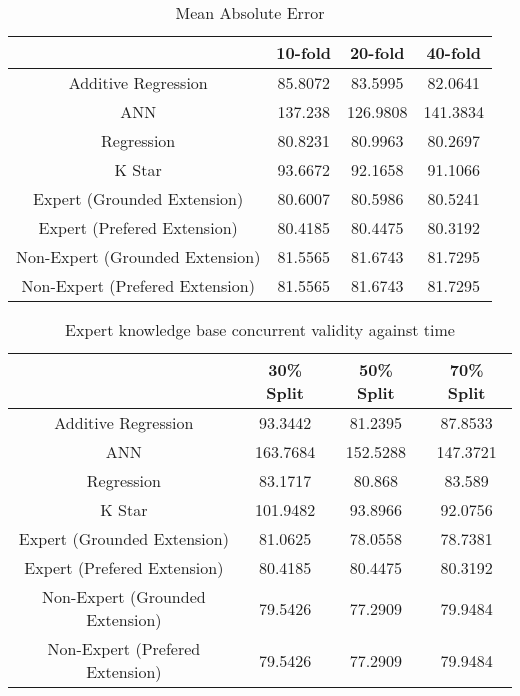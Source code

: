 \begin{table}[!htbp]
\centering
\begin{tabular}{|c|c|c|c|}
\hline
                                &  10-fold & 20-fold & 40-fold \\ \hline
Additive Regression             & 85.8072  & 83.5995  & 82.0641 \\
ANN                             & 137.238 & 126.9808 & 141.3834 \\
Regression                      & 80.8231 & 80.9963 & 80.2697 \\
K Star                          & 93.6672 & 92.1658 & 91.1066 \\
Expert (Grounded Extension)     & 80.6007 & 80.5986 & 80.5241 \\
Expert (Prefered Extension)     & 80.4185 & 80.4475 &  80.3192 \\
Non-Expert (Grounded Extension) & 81.5565 & 81.6743 & 81.7295 \\
Non-Expert (Prefered Extension) & 81.5565 & 81.6743 & 81.7295 \\
\hline
\end{tabular}
\caption{Mean Absolute Error}
\label{tab:time_predictions}
\end{table}

\begin{table}[!htbp]
\centering
\begin{tabular}{|c|c|c|c|}
\hline
                                & 30\% Split  & 50\% Split  & 70\% Split \\ \hline
Additive Regression             & 93.3442  & 81.2395  & 87.8533 \\
ANN                             & 163.7684 & 152.5288 & 147.3721 \\
Regression                      & 83.1717 & 80.868 & 83.589 \\
K Star                          & 101.9482 & 93.8966 & 92.0756 \\
Expert (Grounded Extension)     & 81.0625 & 78.0558 & 78.7381 \\
Expert (Prefered Extension)     & 80.4185 & 80.4475 &  80.3192 \\
Non-Expert (Grounded Extension) & 79.5426 & 77.2909 & 79.9484 \\
Non-Expert (Prefered Extension) & 79.5426 & 77.2909 & 79.9484 \\
\hline
\end{tabular}
\caption{Expert knowledge base concurrent validity against time}
\label{tab:time_predictions}
\end{table}



